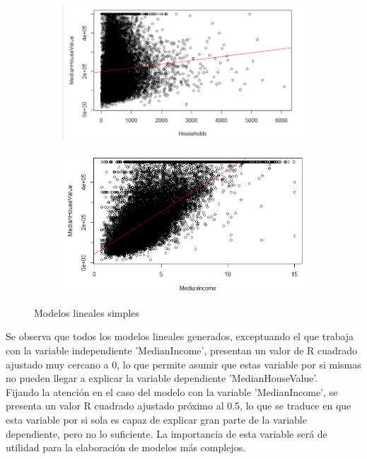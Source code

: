 \begin{figure}[!tbh]
\begin{subfigure}{0.5\textwidth}
	\includegraphics[width=1\linewidth]{figures/regre_7}
	\caption{}
	\label{fig:regre7}
\end{subfigure}\hfil %
\begin{subfigure}{0.5\textwidth}
	\includegraphics[width=1\linewidth]{figures/regre_8}
	\caption{}
	\label{fig:regre8}
\end{subfigure}\hfil %
	
	\caption{Modelos lineales simples}
	\label{lm}
\end{figure}





\newpage
Se observa que todos los modelos lineales generados, exceptuando el que trabaja con la variable independiente 'MedianIncome', presentan un valor de R cuadrado ajustado muy cercano a 0, lo que permite asumir que estas variable por si mismas no pueden llegar a explicar la variable dependiente 'MedianHouseValue'.\\

Fijando la atención en el caso del modelo con la variable 'MedianIncome', se presenta un valor R cuadrado ajustado próximo al 0.5, lo que se traduce en que esta variable por si sola es capaz de explicar gran parte de la variable dependiente, pero no lo suficiente. La importancia de esta variable será de utilidad para la elaboración de modelos más complejos.\\

